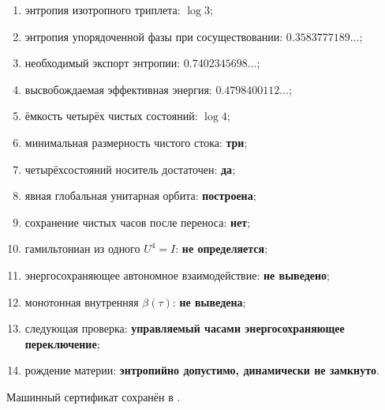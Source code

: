 \begin{protocol}
\begin{enumerate}
 \item энтропия изотропного триплета: \textbf{$\log3$};
 \item энтропия упорядоченной фазы при сосуществовании:
 \textbf{$0.3583777189\ldots$};
 \item необходимый экспорт энтропии:
 \textbf{$0.7402345698\ldots$};
 \item высвобождаемая эффективная энергия:
 \textbf{$0.4798400112\ldots$};
 \item ёмкость четырёх чистых состояний: \textbf{$\log4$};
 \item минимальная размерность чистого стока: \textbf{три};
 \item четырёхсостояний носитель достаточен: \textbf{да};
 \item явная глобальная унитарная орбита: \textbf{построена};
 \item сохранение чистых часов после переноса: \textbf{нет};
 \item гамильтониан из одного $U^4=I$: \textbf{не определяется};
 \item энергосохраняющее автономное взаимодействие: \textbf{не выведено};
 \item монотонная внутренняя $\beta(\tau)$: \textbf{не выведена};
 \item следующая проверка:
 \textbf{управляемый часами энергосохраняющее переключение};
 \item рождение материи:
 \textbf{энтропийно допустимо, динамически не замкнуто}.
\end{enumerate}
\end{protocol}

Машинный сертификат сохранён в
.